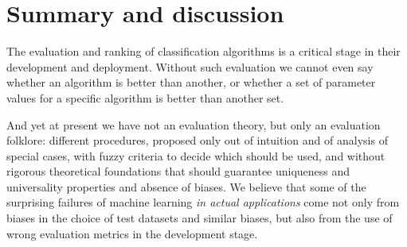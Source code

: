 \documentclass[\ifafour a4paper,12pt,\else a5paper,10pt,\fi%
onecolumn,oneside,article,%
british%
]{memoir}
\theoremstyle{remark}
\theoremstyle{innote}
\renewcommand*{\|}[1][]{\nonscript\:#1\vert\nonscript\:\mathopen{}}
\newcommand*{\eg}{{e.g.}}
\begin{document}
%




\section{Summary and discussion}
\label{sec:discussion}

The evaluation and ranking of classification algorithms is a critical stage in their development and deployment. Without such evaluation we cannot even say whether an algorithm is better than another, or whether a set of parameter values for a specific algorithm is better than another set.

And yet at present we have not an evaluation theory, but only an evaluation folklore: different procedures, proposed only out of intuition and of analysis of special cases, with fuzzy criteria to decide which should be used, and without rigorous theoretical foundations that should guarantee uniqueness and universality properties and absence of biases. We believe that some of the surprising failures of machine learning \emph{in actual applications}\autocites[see \eg][]{varoquauxetal2022} come not only from biases in the choice of test datasets and similar biases, but also from the use of wrong evaluation metrics in the development stage.
\end{document}

